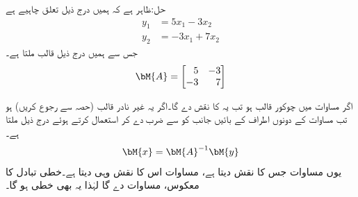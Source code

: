 حل:ظاہر ہے کہ ہمیں درج ذیل تعلق چاہیے ہے 
\begin{align*}
y_1&=5x_1-3x_2\\
y_2&=-3x_1+7x_2
\end{align*} 
جس سے ہمیں درج ذیل قالب  ملتا ہے۔
\begin{align*}
\bM{A}=\begin{bmatrix*}[r] 5&-3\\-3&7 \end{bmatrix*}
\end{align*}

اگر مساوات  میں  چوکور  قالب ہو تب یہ  کا نقش  دے گا۔اگر یہ  غیر نادر قالب (حصہ  سے رجوع کریں) ہو تب مساوات  کے دونوں اطراف کے بائیں جانب کو  سے ضرب دے کر   استعمال کرتے ہوئے درج ذیل  ملتا ہے۔
\begin{align}\label{مساوات_الجبرا_الٹ_تبادلہ_خطی_فضا_الف}
\bM{x}=\bM{A}^{-1}\bM{y}
\end{align}
یوں مساوات  جس  کا نقش  دیتا ہے، مساوات  اس  کا نقش وہی   دیتا ہے۔خطی تبادل کا معکوس، مساوات  دے گا لہٰذا یہ  بھی خطی ہو گا۔

